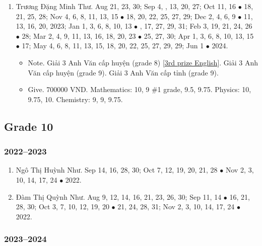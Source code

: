 \documentclass{article}
\begin{document}
\begin{enumerate}
\begin{itemize}
	\end{itemize}
	\item {\sc Trương Đặng Minh Thư.} Aug 21, 23, 30; Sep 4, , 13, 20, 27; Oct 11, 16 $\bullet$ 18, 21, 25, 28; Nov 4, 6, 8, 11, 13, 15 $\bullet$ 18, 20, 22, 25, 27, 29; Dec 2, 4, 6, 9 $\bullet$ 11, 13, 16, 20, 2023; Jan 1, 3, 6, 8, 10, 13 $\bullet$ , 17, 27, 29, 31; Feb 3, 19, 21, 24, 26 $\bullet$ 28; Mar 2, 4, 9, 11, 13, 16, 18, 20, 23 $\bullet$ 25, 27, 30; Apr 1, 3, 6, 8, 10, 13, 15 $\bullet$ 17; May 4, 6, 8, 11, 13, 15, 18, 20, 22, 25, 27, 29, 29; Jun 1 $\bullet$ 2024.
	\begin{itemize}
		\item {\sf Note.} Giải 3 Anh Văn cấp huyện (grade 8) [\href{https://github.com/NQBH/hobby/blob/master/STEM/student/TDMT_3rd_prize_English.jpg}{3rd prize English}]. Giải 3 Anh Văn cấp huyện (grade 9). Giải 3 Anh Văn cấp tỉnh (grade 9).
		\item {\sf Give.} 700000 VND. Mathematics: 10, 9 \#1 grade, 9.5, 9.75. Physics: 10, 9.75, 10. Chemistry: 9, 9, 9.75.
	\end{itemize}
\end{enumerate}


\subsection{Grade 10}

\subsubsection{2022--2023}

\begin{enumerate}
	\item {\sc Ngô Thị Huỳnh Như.} {\sf[In]} Sep 14, 16, 28, 30; Oct 7, 12, 19, 20, 21, 28 $\bullet$ Nov 2, 3, 10, 14, 17, 24 $\bullet$ 2022. {\sf[Out]}
	\item {\sc Đàm Thị Quỳnh Như.} {\sf[In]} Aug 9, 12, 14, 16, 21, 23, 26, 30; Sep 11, 14 $\bullet$ 16, 21, 28, 30; Oct 3, 7, 10, 12, 19, 20 $\bullet$ 21, 24, 28, 31; Nov 2, 3, 10, 14, 17, 24 $\bullet$ 2022. {\sf[Out]}
\end{enumerate}

\subsubsection{2023--2024}
\end{document}
